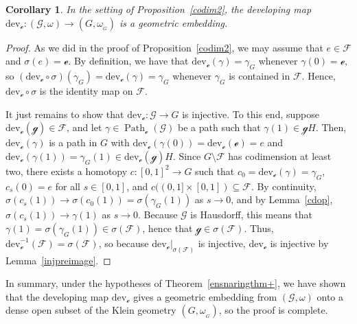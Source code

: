 \documentclass[pdftex]{sigma}
\numberwithin{equation}{section}
\newtheorem{Corollary}[Theorem]{Corollary}
\theoremstyle{definition}
\DeclareMathOperator{\Path}{Path}
\newcommand{\MC}[1]{\omega_{{}_{#1}}}
\begin{document}
\begin{Corollary}\label{codim2cor} In the setting of Proposition~{\rm \ref{codim2}}, the developing map $\mathrm{dev}_\mathscr{e}\colon (\mathscr{G},\omega)\to(G,\MC{G})$ is a geometric embedding.
\end{Corollary}
\begin{proof}As we did in the proof of Proposition~\ref{codim2}, we may assume that $e\in\mathscr{F}$ and $\sigma(e)=\mathscr{e}$. By definition, we have that $\mathrm{dev}_\mathscr{e}(\gamma)=\gamma_G$ whenever $\gamma(0)=\mathscr{e}$, so $(\mathrm{dev}_\mathscr{e}\circ\sigma)(\gamma_G)=\mathrm{dev}_\mathscr{e}(\gamma)=\gamma_G$ whenever $\gamma_G$ is contained in $\mathscr{F}$. Hence, $\mathrm{dev}_\mathscr{e}\circ\sigma$ is the identity map on $\mathscr{F}$.

It just remains to show that $\mathrm{dev}_\mathscr{e}\colon \mathscr{G}\to G$ is injective. To this end, suppose $\mathrm{dev}_\mathscr{e}(\mathscr{g})\in\mathscr{F}$, and let $\gamma\in\Path_\mathscr{e}(\mathscr{G})$ be a path such that $\gamma(1)\in\mathscr{g}H$. Then, $\mathrm{dev}_\mathscr{e}(\gamma)$ is a path in $G$ with $\mathrm{dev}_\mathscr{e}(\gamma(0))=\mathrm{dev}_\mathscr{e}(\mathscr{e})=e$ and $\mathrm{dev}_\mathscr{e}(\gamma(1))=\gamma_G(1)\in\mathrm{dev}_\mathscr{e}(\mathscr{g})H$. Since $G\setminus\mathscr{F}$ has codimension at least two, there exists a homotopy $c\colon [0,1]^2\to G$ such that $c_0=\mathrm{dev}_\mathscr{e}(\gamma)=\gamma_G$, $c_s(0)=e$ for all $s\in[0,1]$, and $c((0,1]\times[0,1])\subseteq\mathscr{F}$. By continuity, $\sigma(c_s(1))\rightarrow \sigma(c_0(1))=\sigma(\gamma_G(1))$ as $s\rightarrow 0$, and by Lemma~\ref{cdop}, $\sigma(c_s(1))\rightarrow \gamma(1)$ as $s\rightarrow 0$. Because $\mathscr{G}$ is Hausdorff, this means that $\gamma(1)=\sigma(\gamma_G(1))\in\sigma(\mathscr{F})$, hence that $\mathscr{g}\in\sigma(\mathscr{F})$. Thus, $\mathrm{dev}_\mathscr{e}^{-1}(\mathscr{F})=\sigma(\mathscr{F})$, so because $\mathrm{dev}_\mathscr{e}|_{\sigma(\mathscr{F})}$ is injective, $\mathrm{dev}_\mathscr{e}$ is injective by Lemma~\ref{injpreimage}.
\end{proof}

In summary, under the hypotheses of Theorem~\ref{ensnaringthm+}, we have shown that the developing map $\mathrm{dev}_\mathscr{e}$ gives a geometric embedding from $(\mathscr{G},\omega)$ onto a dense open subset of the Klein geometry $(G,\MC{G})$, so the proof is complete.
\end{document}
